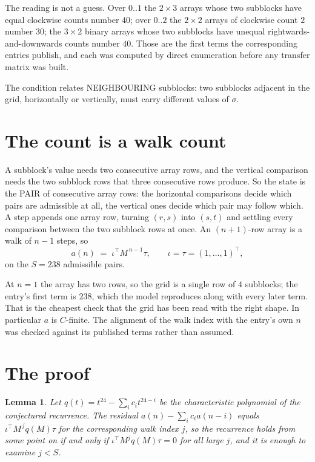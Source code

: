 \documentclass[11pt,a4paper]{article}
\theoremstyle{plain}
\newtheorem{lemma}[theorem]{Lemma}
\theoremstyle{definition}
\begin{document}
The reading is not a guess. Over $0..1$ the $2\times3$ arrays whose two subblocks have equal
clockwise counts number $40$; over $0..2$ the $2\times2$ arrays of clockwise count $2$ number
$30$; the $3\times2$ binary arrays whose two subblocks have unequal rightwards-and-downwards
counts number $40$. Those are the first terms the corresponding entries publish, and each was
computed by direct enumeration before any transfer matrix was built.

The condition relates NEIGHBOURING subblocks: two subblocks adjacent in the grid, horizontally
or vertically, must carry different values of $\sigma$.

\section{The count is a walk count}

A subblock's value needs two consecutive array rows, and the vertical
comparison needs the two subblock rows that three consecutive rows produce. So the state is the
PAIR of consecutive array rows: the horizontal comparisons decide which pairs are admissible at
all, the vertical ones decide which pair may follow which. A step appends one array row,
turning $(r,s)$ into $(s,t)$ and settling every comparison between the two subblock rows at
once. An $(n+1)$-row array is a walk of $n-1$ steps, so
\[
a(n)\;=\;\iota^{\!\top}M^{\,n-1}\tau,\qquad\iota=\tau=(1,\dots,1)^{\!\top},
\]
on the $S=238$ admissible pairs.

At $n=1$ the array has two rows, so the grid is a single row of $4$
subblocks; the entry's first term is $238$, which the model
reproduces along with every later term. That is the cheapest check that the grid has been read
with the right shape.
In particular $a$ is $C$-finite. The alignment of the walk index with the entry's own $n$ was
checked against its published terms rather than assumed.

\section{The proof}

\begin{lemma}\label{lem:crit}
Let $q(t)=t^{24}-\sum_i c_it^{24-i}$ be the characteristic polynomial of the
conjectured recurrence. The residual $a(n)-\sum_ic_ia(n-i)$ equals
$\iota^{\!\top}M^{\,j}q(M)\tau$ for the corresponding walk index $j$, so the recurrence
holds from some point on if and only if $\iota^{\!\top}M^{j}q(M)\tau=0$ for all large $j$,
and it is enough to examine $j<S$.
\end{lemma}
\end{document}
